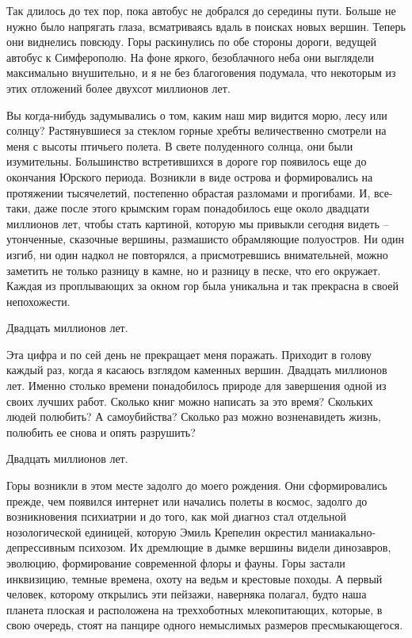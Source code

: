 \documentclass[
]{book}
\begin{document}
Так длилось до тех пор, пока автобус не добрался до середины пути. Больше не нужно было напрягать глаза, всматриваясь вдаль в поисках новых вершин. Теперь они виднелись повсюду. Горы раскинулись по обе стороны дороги, ведущей автобус к Симферополю. На фоне яркого, безоблачного неба они выглядели максимально внушительно, и я не без благоговения подумала, что некоторым из этих отложений более двухсот миллионов лет.

Вы когда-нибудь задумывались о том, каким наш мир видится морю, лесу или солнцу? Растянувшиеся за стеклом горные хребты величественно смотрели на меня с высоты птичьего полета. В свете полуденного солнца, они были изумительны. Большинство встретившихся в дороге гор появилось еще до окончания Юрского периода. Возникли в виде острова и формировались на протяжении тысячелетий, постепенно обрастая разломами и прогибами. И, все-таки, даже после этого крымским горам понадобилось еще около двадцати миллионов лет, чтобы стать картиной, которую мы привыкли сегодня видеть -- утонченные, сказочные вершины, размашисто обрамляющие полуостров. Ни один изгиб, ни один надкол не повторялся, а присмотревшись внимательней, можно заметить не только разницу в камне, но и разницу в песке, что его окружает. Каждая из проплывающих за окном гор была уникальна и так прекрасна в своей непохожести.

Двадцать миллионов лет.

Эта цифра и по сей день не прекращает меня поражать. Приходит в голову каждый раз, когда я касаюсь взглядом каменных вершин. Двадцать миллионов лет. Именно столько времени понадобилось природе для завершения одной из своих лучших работ. Сколько книг можно написать за это время? Скольких людей полюбить? А самоубийства? Сколько раз можно возненавидеть жизнь, полюбить ее снова и опять разрушить?

Двадцать миллионов лет.

Горы возникли в этом месте задолго до моего рождения. Они сформировались прежде, чем появился интернет или начались полеты в космос, задолго до возникновения психиатрии и до того, как мой диагноз стал отдельной нозологической единицей, которую Эмиль Крепелин окрестил маниакально-депрессивным психозом. Их дремлющие в дымке вершины видели динозавров, эволюцию, формирование современной флоры и фауны. Горы застали инквизицию, темные времена, охоту на ведьм и крестовые походы. А первый человек, которому открылись эти пейзажи, наверняка полагал, будто наша планета плоская и расположена на треххоботных млекопитающих, которые, в свою очередь, стоят на панцире одного немыслимых размеров пресмыкающегося.
\end{document}
